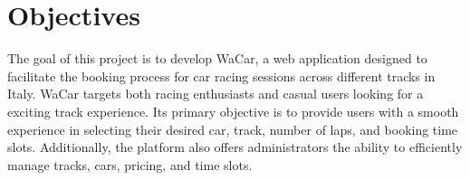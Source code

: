 \section{Objectives}

The goal of this project is to develop WaCar, a web application designed to facilitate the booking process for car racing sessions across different tracks in Italy.
WaCar targets both racing enthusiasts and casual users looking for a exciting track experience.
Its primary objective is to provide users with a smooth experience in selecting their desired car, track, number of laps, and booking time slots.
Additionally, the platform also offers administrators the ability to efficiently manage tracks, cars, pricing, and time slots.